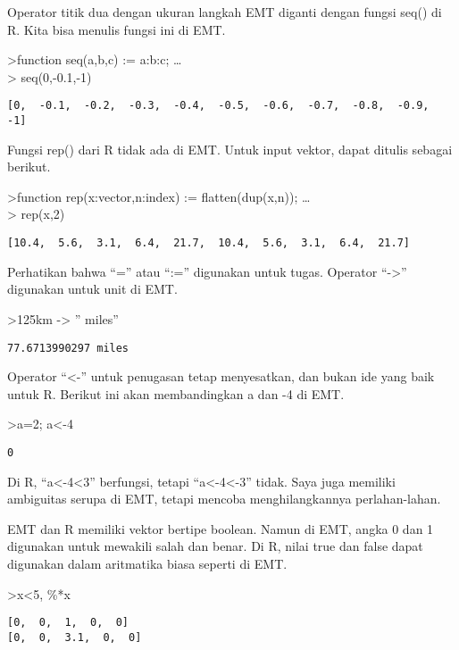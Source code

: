 \documentclass[
]{book}
\begin{document}
Operator titik dua dengan ukuran langkah EMT diganti dengan fungsi seq() di R. Kita bisa menulis fungsi ini di EMT.

\textgreater function seq(a,b,c) := a:b:c; \ldots{}\\
\textgreater{} seq(0,-0.1,-1)

\begin{verbatim}
[0,  -0.1,  -0.2,  -0.3,  -0.4,  -0.5,  -0.6,  -0.7,  -0.8,  -0.9,  -1]
\end{verbatim}

Fungsi rep() dari R tidak ada di EMT. Untuk input vektor, dapat ditulis sebagai berikut.

\textgreater function rep(x:vector,n:index) := flatten(dup(x,n)); \ldots{}\\
\textgreater{} rep(x,2)

\begin{verbatim}
[10.4,  5.6,  3.1,  6.4,  21.7,  10.4,  5.6,  3.1,  6.4,  21.7]
\end{verbatim}

Perhatikan bahwa ``='' atau ``:='' digunakan untuk tugas. Operator ``-\textgreater{}'' digunakan untuk unit di EMT.

\textgreater125km -\textgreater{} '' miles''

\begin{verbatim}
77.6713990297 miles
\end{verbatim}

Operator ``\textless-'' untuk penugasan tetap menyesatkan, dan bukan ide yang baik untuk R. Berikut ini akan membandingkan a dan -4 di EMT.

\textgreater a=2; a\textless-4

\begin{verbatim}
0
\end{verbatim}

Di R, ``a\textless-4\textless3'' berfungsi, tetapi ``a\textless-4\textless-3'' tidak. Saya juga memiliki ambiguitas serupa di EMT, tetapi mencoba menghilangkannya perlahan-lahan.

EMT dan R memiliki vektor bertipe boolean. Namun di EMT, angka 0 dan 1 digunakan untuk mewakili salah dan benar. Di R, nilai true dan false dapat digunakan dalam aritmatika biasa seperti di EMT.

\textgreater x\textless5, \%*x

\begin{verbatim}
[0,  0,  1,  0,  0]
[0,  0,  3.1,  0,  0]
\end{verbatim}
\end{document}
